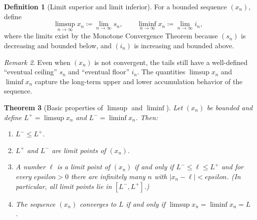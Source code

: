 \documentclass[12pt]{article}
\numberwithin{equation}{section}
\def\abs#1{|#1|}
\def\eps{epsilon}
\DeclarePairedDelimiter{\abs}{\lvert}{\rvert}
\newcommand{\eps}{\varepsilon}               %
\theoremstyle{plain}
\newtheorem{theorem}{Theorem}[section]
\theoremstyle{definition}
\newtheorem{definition}[theorem]{Definition}
\theoremstyle{remark}
\newtheorem{remark}[theorem]{Remark}
\begin{document}
\begin{definition}[Limit superior and limit inferior]\label{def:limsup-liminf}
For a bounded sequence $(x_n)$, define
\[
\limsup_{n\to\infty} x_n \coloneqq \lim_{n\to\infty} s_n,
\qquad
\liminf_{n\to\infty} x_n \coloneqq \lim_{n\to\infty} i_n,
\]
where the limits exist by the Monotone Convergence Theorem because $(s_n)$ is decreasing and bounded below, and $(i_n)$ is increasing and bounded above.
\end{definition}

\begin{remark}
Even when $(x_n)$ is not convergent, the tails still have a well-defined ``eventual ceiling'' $s_n$ and ``eventual floor'' $i_n$.
The quantities $\limsup x_n$ and $\liminf x_n$ capture the long-term upper and lower accumulation behavior of the sequence.
\end{remark}

\begin{theorem}[Basic properties of $\limsup$ and $\liminf$]\label{thm:limsup-liminf-basic}
Let $(x_n)$ be bounded and define $L^+=\limsup x_n$ and $L^-=\liminf x_n$.
Then:
\begin{enumerate}[label=(\alph*)]
\item $L^- \le L^+$.
\item $L^+$ and $L^-$ are limit points of $(x_n)$.
\item A number $\ell$ is a limit point of $(x_n)$ if and only if $L^-\le \ell \le L^+$ \emph{and} for every $\eps>0$ there are infinitely many $n$ with $\abs{x_n-\ell}<\eps$.
(In particular, all limit points lie in $[L^-,L^+]$.)
\item The sequence $(x_n)$ converges to $L$ if and only if $\limsup x_n=\liminf x_n=L$.
\end{enumerate}
\end{theorem}
\end{document}
